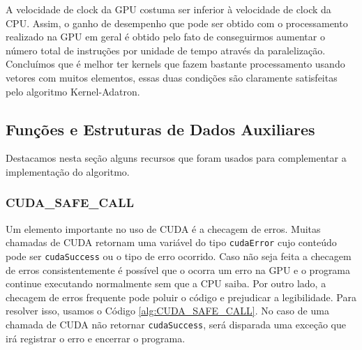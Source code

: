 A velocidade de clock da GPU costuma ser inferior à velocidade de clock da CPU. 
Assim, o ganho de desempenho que pode ser obtido com o processamento realizado na GPU
em geral é obtido pelo fato de conseguirmos 
aumentar o número total de instruções por unidade de tempo através da paralelização.
Concluímos que é melhor ter kernels que fazem bastante processamento usando vetores com muitos elementos, essas duas condições são claramente satisfeitas pelo algoritmo Kernel-Adatron.


\subsection{Funções e Estruturas de Dados Auxiliares}

Destacamos nesta seção alguns recursos que foram usados para complementar a implementação
do algoritmo.


\subsubsection{CUDA\_SAFE\_CALL}
Um elemento importante no uso de CUDA é a checagem de erros. Muitas chamadas de CUDA retornam uma variável do tipo \texttt{cudaError} cujo conteúdo pode ser \texttt{cudaSuccess} ou o tipo de erro ocorrido. Caso não seja feita a checagem de erros consistentemente é possível que o ocorra um erro na GPU e o programa continue executando normalmente sem que a CPU saiba. Por outro lado, a checagem de erros frequente pode poluir o código e prejudicar a legibilidade. Para resolver isso, usamos o Código \ref{alg:CUDA_SAFE_CALL}. No caso de uma chamada de CUDA não retornar \texttt{cudaSuccess}, será disparada uma exceção que irá registrar o erro e encerrar o programa.


